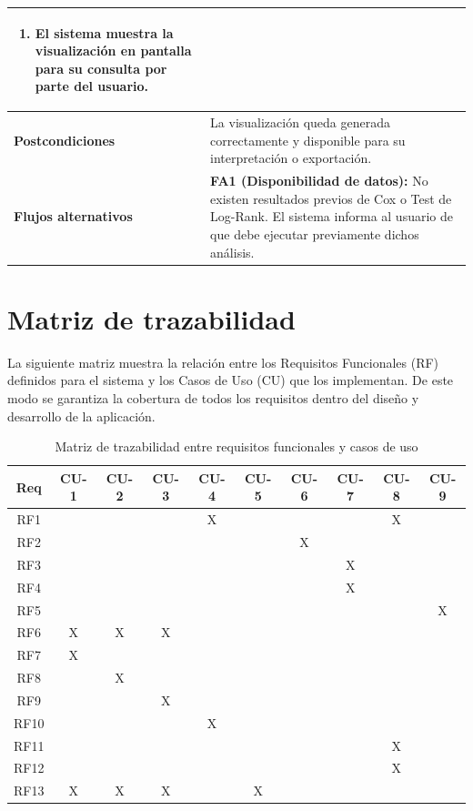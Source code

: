 \begin{longtable}{|p{4cm}|p{10cm}|}
\begin{enumerate}
    \item El sistema muestra la visualización en pantalla para su consulta por parte del usuario.
\end{enumerate} \\ \hline

\textbf{Postcondiciones} & 
La visualización queda generada correctamente y disponible para su interpretación o exportación. \\ \hline

\textbf{Flujos alternativos} & 
\textbf{FA1 (Disponibilidad de datos):} No existen resultados previos de Cox o Test de Log-Rank. El sistema informa al usuario de que debe ejecutar previamente dichos análisis. \\ \hline

\end{longtable}


\section{Matriz de trazabilidad}
La siguiente matriz muestra la relación entre los Requisitos Funcionales (RF) definidos 
para el sistema y los Casos de Uso (CU) que los implementan. De este modo se 
garantiza la cobertura de todos los requisitos dentro del diseño y desarrollo de la 
aplicación. 
\begin{table}[H]
\centering
\small
\begin{tabular}{|c|c|c|c|c|c|c|c|c|c|}
\hline
\textbf{Req} & \textbf{CU-1} & \textbf{CU-2} & \textbf{CU-3} & \textbf{CU-4} & \textbf{CU-5} & \textbf{CU-6} & \textbf{CU-7} & \textbf{CU-8} & \textbf{CU-9} \\ \hline

RF1  &  &  &  & X &  &  &  & X &  \\ \hline
RF2  &  &  &  &  &  & X &  &  &  \\ \hline
RF3  &  &  &  &  &  &  & X &  &  \\ \hline
RF4  &  &  &  &  &  &  & X &  &  \\ \hline
RF5  &  &  &  &  &  &  &  &  & X \\ \hline
RF6  & X & X & X &  &  &  &  &  &  \\ \hline
RF7  & X &  &  &  &  &  &  &  &  \\ \hline
RF8  &  & X &  &  &  &  &  &  &  \\ \hline
RF9  &  &  & X &  &  &  &  &  &  \\ \hline
RF10 &  &  &  & X &  &  &  &  &  \\ \hline
RF11 &  &  &  &  &  &  &  & X &  \\ \hline
RF12 &  &  &  &  &  &  &  & X &  \\ \hline
RF13 & X & X & X &  & X &  &  &  &  \\ \hline

\end{tabular}
\caption{Matriz de trazabilidad entre requisitos funcionales y casos de uso}
\label{tab:trazabilidad}
\normalsize
\end{table}
